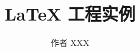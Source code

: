 



\makeindex
\title{LaTeX 工程实例}
\author{作者 XXX}


\frontmatter



\tableofcontents

\mainmatter



\appendix



\backmatter

\printindex

